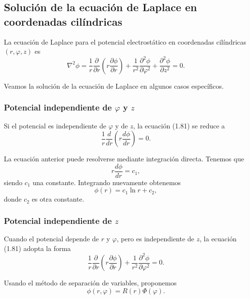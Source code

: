 \documentclass[12pt,a4paper]{book}
\begin{document}
\subsection{Solución de la ecuación de Laplace en coordenadas cilíndricas}

La ecuación de Laplace para el potencial electrostático en coordenadas cilíndricas $(r, \varphi, z)$ es
\begin{equation}
\nabla^2\phi = \frac{1}{r}\frac{\partial}{\partial r}\left(r\frac{\partial \phi}{\partial r}\right) + \frac{1}{r^2}\frac{\partial^2\phi}{\partial\varphi^2} + \frac{\partial^2\phi}{\partial z^2} = 0.
\end{equation}

Veamos la solución de la ecuación de Laplace en algunos casos específicos.

\subsubsection{Potencial independiente de $\varphi$ y $z$}

Si el potencial es independiente de $\varphi$ y de $z$, la ecuación (1.81) se reduce a
\begin{equation}
\frac{1}{r}\frac{d}{dr}\left(r\frac{d\phi}{dr}\right) = 0.
\end{equation}

La ecuación anterior puede resolverse mediante integración directa. Tenemos que
\begin{equation}
r\frac{d\phi}{dr} = c_1,
\end{equation}
siendo $c_1$ una constante. Integrando nuevamente obtenemos
\begin{equation}
\phi(r) = c_1\ln r + c_2,
\end{equation}
donde $c_2$ es otra constante.

\subsubsection{Potencial independiente de $z$}

Cuando el potencial depende de $r$ y $\varphi$, pero es independiente de $z$, la ecuación (1.81) adopta la forma
\begin{equation}
\frac{1}{r}\frac{\partial}{\partial r}\left(r\frac{\partial \phi}{\partial r}\right) + \frac{1}{r^2}\frac{\partial^2\phi}{\partial\varphi^2} = 0.
\end{equation}

Usando el método de separación de variables, proponemos
\begin{equation}
\phi(r, \varphi) = R(r)\Phi(\varphi).
\end{equation}
\end{document}
